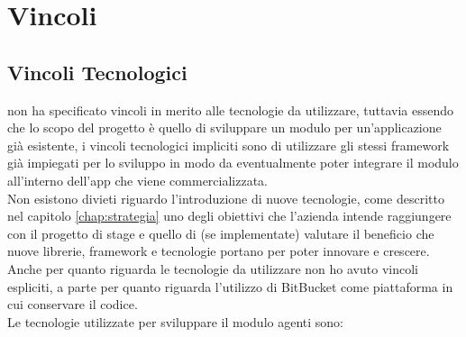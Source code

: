 \section{Vincoli}
\subsection{Vincoli Tecnologici}\label{chap:vincoli tec}
{\company} non ha specificato vincoli in merito alle tecnologie da utilizzare, tuttavia essendo che lo scopo del progetto è quello di 
sviluppare un modulo per un'applicazione già esistente, i vincoli tecnologici impliciti sono di utilizzare gli stessi framework già 
impiegati per lo sviluppo in modo da eventualmente poter integrare il modulo all'interno dell'app che viene commercializzata.\\
Non esistono divieti riguardo l'introduzione di nuove tecnologie, come descritto nel capitolo \ref{chap:strategia} uno degli obiettivi 
che l'azienda intende raggiungere con il progetto di stage e quello di (se implementate) valutare il beneficio che nuove librerie, framework 
e tecnologie portano per poter innovare e crescere.\\
Anche per quanto riguarda le tecnologie da utilizzare non ho avuto vincoli espliciti, a parte per quanto riguarda l'utilizzo di BitBucket 
come piattaforma in cui conservare il codice.\\
Le tecnologie utilizzate per sviluppare il modulo agenti sono:
